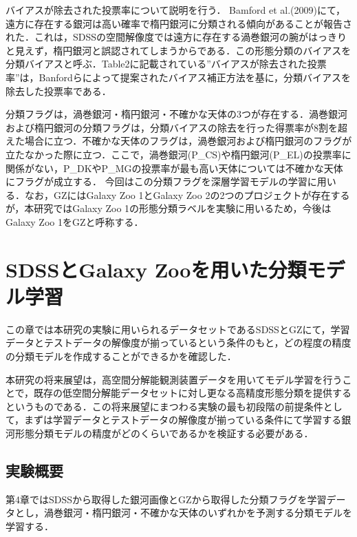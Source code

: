 \documentclass[a4j, 11pt]{jreport}
\begin{document}
バイアスが除去された投票率について説明を行う．
Bamford et al.(2009)\cite{Bamford2009}にて，遠方に存在する銀河は高い確率で楕円銀河に分類される傾向があることが報告された．これは，SDSSの空間解像度では遠方に存在する渦巻銀河の腕がはっきりと見えず，楕円銀河と誤認されてしまうからである．この形態分類のバイアスを分類バイアスと呼ぶ．Table2に記載されている''バイアスが除去された投票率''は，Banfordらによって提案されたバイアス補正方法を基に，分類バイアスを除去した投票率である．

分類フラグは，渦巻銀河・楕円銀河・不確かな天体の3つが存在する．渦巻銀河および楕円銀河の分類フラグは，分類バイアスの除去を行った得票率が8割を超えた場合に立つ．不確かな天体のフラグは，渦巻銀河および楕円銀河のフラグが立たなかった際に立つ．ここで，渦巻銀河(P\_CS)や楕円銀河(P\_EL)の投票率に関係がない，P\_DKやP\_MGの投票率が最も高い天体については不確かな天体にフラグが成立する．
今回はこの分類フラグを深層学習モデルの学習に用いる．なお，GZにはGalaxy Zoo 1とGalaxy Zoo 2の2つのプロジェクトが存在するが，本研究ではGalaxy Zoo 1の形態分類ラベルを実験に用いるため，今後はGalaxy Zoo 1をGZと呼称する．


\newpage
\chapter{SDSSとGalaxy Zooを用いた分類モデル学習}
この章では本研究の実験に用いられるデータセットであるSDSSとGZにて，学習データとテストデータの解像度が揃っているという条件のもと，どの程度の精度の分類モデルを作成することができるかを確認した．

本研究の将来展望は，高空間分解能観測装置データを用いてモデル学習を行うことで，既存の低空間分解能データセットに対し更なる高精度形態分類を提供するというものである．この将来展望にまつわる実験の最も初段階の前提条件として，まずは学習データとテストデータの解像度が揃っている条件にて学習する銀河形態分類モデルの精度がどのくらいであるかを検証する必要がある．

\section{実験概要}
第4章ではSDSSから取得した銀河画像とGZから取得した分類フラグを学習データとし，渦巻銀河・楕円銀河・不確かな天体のいずれかを予測する分類モデルを学習する．
\end{document}
